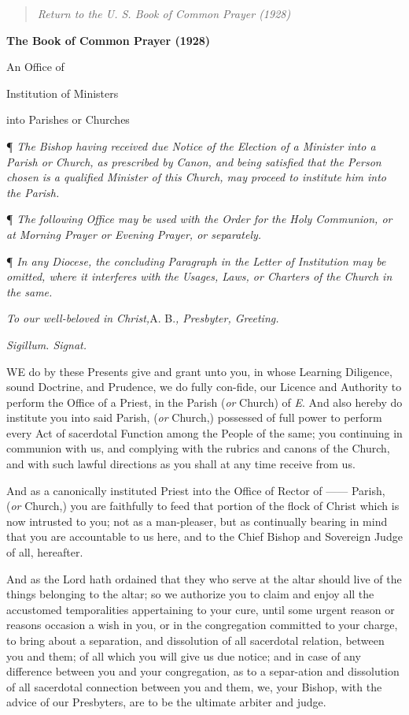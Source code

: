 \begin{quote}

\emph{Return to the U.
S. Book of Common Prayer (1928)}

\end{quote}


\textbf{The Book of Common Prayer (1928)}

An
Office of 

Institution of Ministers 

into Parishes or Churches

¶
\emph{The Bishop having received due Notice of the Election of a Minister
into a Parish or Church, as prescribed by Canon, and being satisfied
that the Person chosen is a qualified Minister of this Church, may proceed
to institute him into the Parish.}

¶ \emph{The following Office may be used with the Order for the Holy
Communion, or at Morning Prayer or Evening Prayer, or separately.}

¶ \emph{In any Diocese, the concluding Paragraph in the Letter of
Institution may be omitted, where it interferes with the Usages, Laws,
or Charters of the Church in the same.}

\emph{To
our well-beloved in Christ,}A. B.\emph{, Presbyter, Greeting.}

\emph{Sigillum. Signat.}

WE
do by these Presents give and grant unto you, in whose Learning Diligence,
sound Doctrine, and Prudence, we do fully con-fide, our Licence and Authority
to perform the Office of a Priest, in the Parish (\emph{or} Church)
of \emph{E}. And also hereby do institute you into said Parish, (\emph{or}
Church,) possessed of full power to perform every Act of sacerdotal Function
among the People of the same; you continuing in communion with us, and
complying with the rubrics and canons of the Church, and with such lawful
directions as you shall at any time receive from us.

And as a canonically instituted Priest into the Office
of Rector of —— Parish, (\emph{or} Church,) you are faithfully
to feed that portion of the flock of Christ which is now intrusted to
you; not as a man-pleaser, but as continually bearing in mind that you
are accountable to us here, and to the Chief Bishop and Sovereign Judge
of all, hereafter. 

And as the Lord hath ordained that they who serve at
the altar should live of the things belonging to the altar; so we authorize
you to claim and enjoy all the accustomed temporalities appertaining to
your cure, until some urgent reason or reasons occasion a wish in you,
or in the congregation committed to your charge, to bring about a separation,
and dissolution of all sacerdotal relation, between you and them; of all
which you will give us due notice; and in case of any difference between
you and your congregation, as to a separ-ation and dissolution of all
sacerdotal connection between you and them, we, your Bishop, with the
advice of our Presbyters, are to be the ultimate arbiter and judge.

